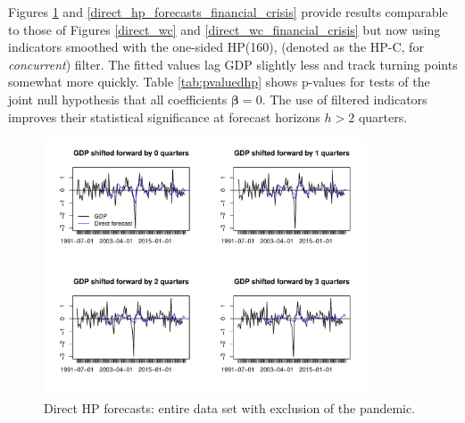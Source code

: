 \documentclass[11pt,a4paper]{article}
\begin{document}
Figures \ref{direct_hp_forecasts} and \ref{direct_hp_forecasts_financial_crisis} provide results comparable to those of Figures \ref{direct_wc} and \ref{direct_wc_financial_crisis} but now using indicators smoothed with the one-sided HP(160), (denoted as the HP-C, for \textit{concurrent}) filter.  The fitted values lag GDP slightly less and track turning points somewhat more quickly. Table \ref{tab:pvaluedhp} shows p-values for tests of the joint null hypothesis that all coefficients ${\boldsymbol{\beta}} = 0$. The use of filtered indicators improves their statistical significance at forecast horizons $h > 2$ quarters. 

\begin{figure}[H]
    \begin{center}
        \includegraphics[width=0.85\textwidth]{./Figures/direct_hp_forecasts.pdf}
        \caption{Direct HP forecasts: entire data set with exclusion of the pandemic.
        \label{direct_hp_forecasts}}
    \end{center}
\end{figure}
\end{document}
